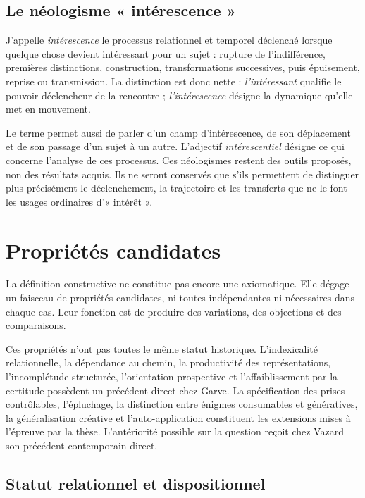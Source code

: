 \documentclass[11pt,a4paper]{article}
\begin{document}
\subsection{Le néologisme « intérescence »}

J'appelle \emph{intérescence} le processus relationnel et temporel déclenché
lorsque quelque chose devient intéressant pour un sujet : rupture de
l'indifférence, premières distinctions, construction, transformations
successives, puis épuisement, reprise ou transmission. La distinction est donc
nette : \emph{l'intéressant} qualifie le pouvoir déclencheur de la rencontre ;
\emph{l'intérescence} désigne la dynamique qu'elle met en mouvement.

Le terme permet aussi de parler d'un champ d'intérescence, de son déplacement
et de son passage d'un sujet à un autre. L'adjectif \emph{intérescentiel} désigne
ce qui concerne l'analyse de ces processus. Ces néologismes restent des outils
proposés, non des résultats acquis. Ils ne seront conservés que s'ils permettent
de distinguer plus précisément le déclenchement, la trajectoire et les transferts
que ne le font les usages ordinaires d'« intérêt ».

\section{Propriétés candidates}

La définition constructive ne constitue pas encore une axiomatique. Elle dégage
un faisceau de propriétés candidates, ni toutes indépendantes ni nécessaires
dans chaque cas. Leur fonction est de produire des variations, des objections
et des comparaisons.

Ces propriétés n'ont pas toutes le même statut historique. L'indexicalité
relationnelle, la dépendance au chemin, la productivité des représentations,
l'incomplétude structurée, l'orientation prospective et l'affaiblissement par
la certitude possèdent un précédent direct chez Garve. La spécification des
prises contrôlables, l'épluchage, la distinction entre énigmes consumables et
génératives, la généralisation créative et l'auto-application constituent les
extensions mises à l'épreuve par la thèse. L'antériorité possible sur la
question reçoit chez Vazard son précédent contemporain direct.

\subsection{Statut relationnel et dispositionnel}
\end{document}
